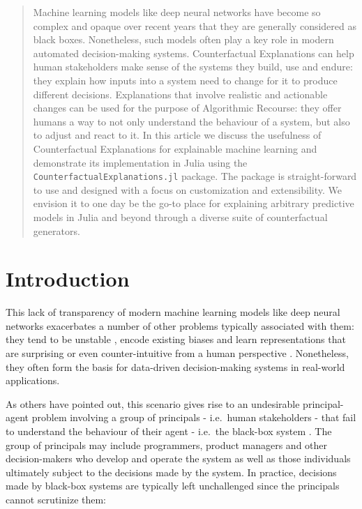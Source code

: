 \documentclass{juliacon}
\begin{document}


\maketitle

\begin{abstract}

Machine learning models like deep neural networks have become so complex and opaque over recent years that they are generally considered as black boxes. Nonetheless, such models often play a key role in modern automated decision-making systems. Counterfactual Explanations can help human stakeholders make sense of the systems they build, use and endure: they explain how inputs into a system need to change for it to produce different decisions. Explanations that involve realistic and actionable changes can be used for the purpose of Algorithmic Recourse: they offer humans a way to not only understand the behaviour of a system, but also to adjust and react to it. In this article we discuss the usefulness of Counterfactual Explanations for explainable machine learning and demonstrate its implementation in Julia using the \verb|CounterfactualExplanations.jl| package. The package is straight-forward to use and designed with a focus on customization and extensibility. We envision it to one day be the go-to place for explaining arbitrary predictive models in Julia and beyond through a diverse suite of counterfactual generators.

\end{abstract}

\hypertarget{sec-intro}{%
\section{Introduction}\label{sec-intro}}

This lack of transparency of modern machine learning models like deep
neural networks exacerbates a number of other problems typically
associated with them: they tend to be unstable
\cite{goodfellow2014explaining}, encode existing biases
\cite{buolamwini2018gender} and learn representations that are
surprising or even counter-intuitive from a human perspective
\cite{sturm2014simple}. Nonetheless, they often form the basis for
data-driven decision-making systems in real-world applications.

As others have pointed out, this scenario gives rise to an undesirable
principal-agent problem involving a group of principals - i.e.~human
stakeholders - that fail to understand the behaviour of their agent -
i.e.~the black-box system \cite{borch2022machine}. The group of
principals may include programmers, product managers and other
decision-makers who develop and operate the system as well as those
individuals ultimately subject to the decisions made by the system. In
practice, decisions made by black-box systems are typically left
unchallenged since the principals cannot scrutinize them:
\end{document}
